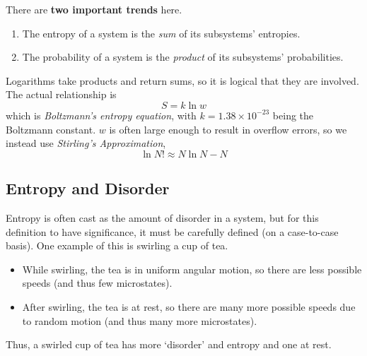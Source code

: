 \documentclass[../PhysicsFormulae.tex]{subfiles}
\begin{document}
There are \textbf{two important trends} here. 
\begin{enumerate}
	\item The entropy of a system is the \textit{sum} of its subsystems' entropies. 
	\item The probability of a system is the \textit{product} of its subsystems' probabilities. 
\end{enumerate}
Logarithms take products and return sums, so it is logical that they are involved. The actual relationship is 
\[ S = k \ln{w} \]
which is \textit{Boltzmann's entropy equation}, with $k = 1.38 \times 10^{-23}$ being the Boltzmann constant. $w$ is often large enough to result in overflow errors, so we instead use \textit{Stirling's Approximation}, 
\[ \ln{N!} \approx N \ln{N} - N \]

\subsection{Entropy and Disorder}
Entropy is often cast as the amount of disorder in a system, but for this definition to have significance, it must be carefully defined (on a case-to-case basis). One example of this is swirling a cup of tea. 
\begin{itemize}
	\item While swirling, the tea is in uniform angular motion, so there are less possible speeds (and thus few microstates). 
	\item After swirling, the tea is at rest, so there are many more possible speeds due to random motion (and thus many more microstates). 
\end{itemize}
Thus, a swirled cup of tea has more `disorder' and entropy and one at rest. 
\end{document}
